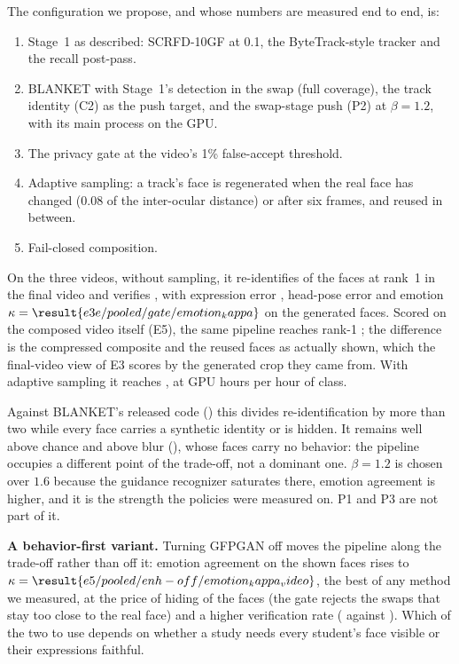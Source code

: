The configuration we propose, and whose numbers are measured end to end, is:
\begin{enumerate}
\item Stage~1 as described: SCRFD-10GF at 0.1, the ByteTrack-style tracker and
the recall post-pass.
\item BLANKET with Stage~1's detection in the swap (full coverage), the track
identity (C2) as the push target, and the swap-stage push (P2) at $\beta = 1.2$,
with its main process on the GPU.
\item The privacy gate at the video's 1\% false-accept threshold.
\item Adaptive sampling: a track's face is regenerated when the real face has
changed (0.08 of the inter-ocular distance) or after six frames, and reused in
between.
\item Fail-closed composition.
\end{enumerate}
On the three videos, without sampling, it re-identifies
 of the faces at rank~1 in the final
video and verifies , with
expression error , head-pose error
\textdegree{} and emotion
$\kappa = \result{e3e/pooled/gate/emotion_kappa}$ on the generated faces. Scored
on the composed video itself (E5), the same pipeline reaches rank-1
; the difference is the compressed
composite and the reused faces as actually shown, which the final-video view of
E3 scores by the generated crop they came from. With adaptive sampling it reaches
, at
 GPU hours per hour of class.

Against BLANKET's released code () this
divides re-identification by more than two while every face carries a synthetic
identity or is hidden. It remains well above chance and above blur
(), whose faces carry no behavior: the
pipeline occupies a different point of the trade-off, not a dominant one.
$\beta = 1.2$ is chosen over $1.6$ because the guidance recognizer saturates
there, emotion agreement is higher, and it is the strength the policies were
measured on. P1 and P3 are not part of it.

\textbf{A behavior-first variant.} Turning GFPGAN off moves the pipeline along the
trade-off rather than off it: emotion agreement on the shown faces rises to
$\kappa = \result{e5/pooled/enh-off/emotion_kappa_video}$, the best of any
method we measured, at the price of hiding
 of the faces (the gate rejects the
swaps that stay too close to the real face) and a higher verification rate
( against
). Which of the two to use depends
on whether a study needs every student's face visible or their expressions
faithful.

